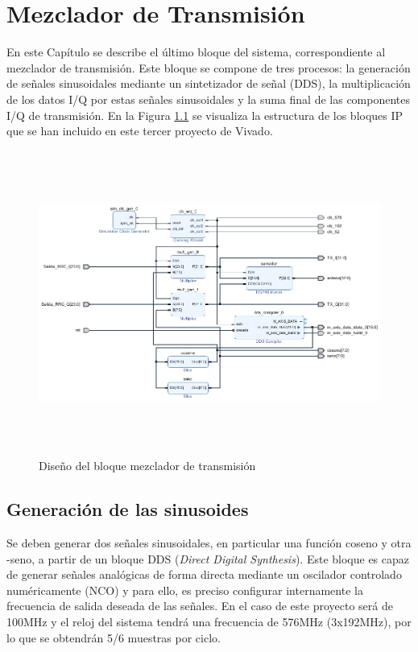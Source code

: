 \chapter{Mezclador de Transmisión}
\label{section:mezcla}

En este Capítulo se describe el último bloque del sistema, correspondiente al mezclador de transmisión. Este bloque se compone de tres procesos: la generación de señales sinusoidales mediante un sintetizador de señal (DDS), la multiplicación de los datos I/Q por estas señales sinusoidales y la suma final de las componentes I/Q de transmisión. En la Figura \ref{fig:mezclador} se visualiza la estructura de los bloques IP que se han incluido en este tercer proyecto de Vivado.

\begin{figure}[h]
    \centering
    \includegraphics[width=1.05\textwidth, height=10cm]{img/diseno/mezclador.PNG}
    \caption{Diseño del bloque mezclador de transmisión}
    \label{fig:mezclador}
\end{figure}

\pagebreak

\section{Generación de las sinusoides}

Se deben generar dos señales sinusoidales, en particular una función coseno y otra -seno, a partir de un bloque DDS (\textit{Direct Digital Synthesis}). Este bloque es capaz de generar señales analógicas de forma directa mediante un oscilador controlado numéricamente (NCO) y para ello, es preciso configurar internamente la frecuencia de salida deseada de las señales. En el caso de este proyecto será de 100MHz y el reloj del sistema tendrá una frecuencia de 576MHz (3x192MHz), por lo que se obtendrán 5/6 muestras por ciclo.


